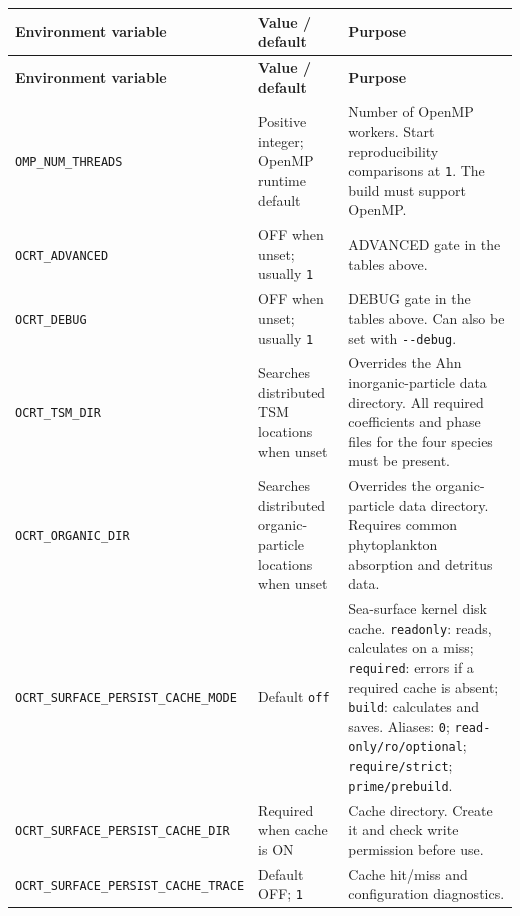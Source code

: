 {\TableFont
\begin{longtable}{@{}>{\raggedright\arraybackslash}p{}>{\raggedright\arraybackslash}p{}>{\raggedright\arraybackslash}p{}@{}}
\toprule
\textbf{Environment variable} & \textbf{Value / default} & \textbf{Purpose} \\
\midrule
\endfirsthead
\toprule
\textbf{Environment variable} & \textbf{Value / default} & \textbf{Purpose} \\
\midrule
\endhead
\bottomrule
\endfoot
\texttt{OMP\_\allowbreak{}NUM\_\allowbreak{}THREADS} & Positive integer; OpenMP runtime default & Number of OpenMP workers. Start reproducibility comparisons at \texttt{1}. The build must support OpenMP. \\
\texttt{OCRT\_\allowbreak{}ADVANCED} & OFF when unset; usually \texttt{1} & ADVANCED gate in the tables above. \\
\texttt{OCRT\_\allowbreak{}DEBUG} & OFF when unset; usually \texttt{1} & DEBUG gate in the tables above. Can also be set with \texttt{-\allowbreak{}-\allowbreak{}debug}. \\
\texttt{OCRT\_\allowbreak{}TSM\_\allowbreak{}DIR} & Searches distributed TSM locations when unset & Overrides the Ahn inorganic-particle data directory. All required coefficients and phase files for the four species must be present. \\
\texttt{OCRT\_\allowbreak{}ORGANIC\_\allowbreak{}DIR} & Searches distributed organic-particle locations when unset & Overrides the organic-particle data directory. Requires common phytoplankton absorption and detritus data. \\
\texttt{OCRT\_\allowbreak{}SURFACE\_\allowbreak{}PERSIST\_\allowbreak{}CACHE\_\allowbreak{}MODE} & Default \texttt{off} & Sea-surface kernel disk cache. \texttt{readonly}: reads, calculates on a miss; \texttt{required}: errors if a required cache is absent; \texttt{build}: calculates and saves. Aliases: \texttt{0}; \texttt{read-\allowbreak{}only/\allowbreak{}ro/\allowbreak{}optional}; \texttt{require/\allowbreak{}strict}; \texttt{prime/\allowbreak{}prebuild}. \\
\texttt{OCRT\_\allowbreak{}SURFACE\_\allowbreak{}PERSIST\_\allowbreak{}CACHE\_\allowbreak{}DIR} & Required when cache is ON & Cache directory. Create it and check write permission before use. \\
\texttt{OCRT\_\allowbreak{}SURFACE\_\allowbreak{}PERSIST\_\allowbreak{}CACHE\_\allowbreak{}TRACE} & Default OFF; \texttt{1} & Cache hit/miss and configuration diagnostics. \\

\end{longtable}}
